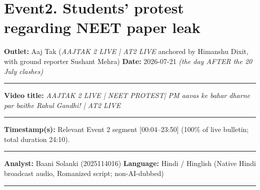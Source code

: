 \documentclass[10pt,a4paper]{article}
\newcommand{\formrule}{\par\vspace{3pt}\noindent\rule{\textwidth}{0.35pt}\par\vspace{7pt}}
\newcommand{\sectionrule}{\par\vspace{4pt}\noindent\rule{\textwidth}{0.4pt}\par\vspace{8pt}}
\begin{document}
\newpage
\section*{Event2. Students' protest regarding NEET paper leak}
\par\vspace{6pt}
{\small
\noindent\textbf{Outlet:} Aaj Tak (\emph{AAJTAK 2 LIVE | AT2 LIVE} anchored by Himanshu Dixit, with ground reporter Sushant Mehra) \hfill \textbf{Date:} 2026-07-21 \emph{(the day AFTER the 20 July clashes)}
\formrule
\noindent\textbf{Video title:} \emph{AAJTAK 2 LIVE | NEET PROTEST| PM aavas ke bahar dharne par baithe Rahul Gandhi! | AT2 LIVE}
\formrule
\noindent\textbf{Timestamp(s):} Relevant Event 2 segment [00:04--23:50] (100\% of live bulletin; total duration 24:10).
\formrule
\noindent\textbf{Analyst:} Baani Solanki (2025114016) \hfill \textbf{Language:} Hindi / Hinglish (Native Hindi broadcast audio, Romanized script; non-AI-dubbed)
}
\sectionrule
\end{document}
